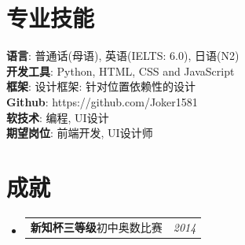 \documentclass[a4paper,UTF8]{ctexart}
\makeatletter
\newcommand{\resumePOR}[3]{
\vspace{0.5mm}\item
    \begin{tabular*}{0.97\textwidth}[t]{l@{\extracolsep{\fill}}r}
        \textbf{#1}\hspace{0.3mm}#2 & \textit{\small{#3}} 
    \end{tabular*}
    \vspace{-2mm}
}
\newcommand{\resumeSubHeadingListStart}{\begin{itemize}[leftmargin=*,labelsep=0mm]}
\newcommand{\resumeSubHeadingListEnd}{\end{itemize}\vspace{2mm}}
\makeatother
\begin{document}
\section{\textbf{专业技能}}
 \begin{itemize}[leftmargin=0.05in, label={}]
    \small{\item{
     \textbf{语言}{: 普通话(母语), 英语(IELTS: 6.0), 日语(N2)} \\
     \textbf{开发工具}{: Python, HTML, CSS and JavaScript} \\
     \textbf{框架}{: 设计框架: 针对位置依赖性的设计} \\
     \textbf{Github}{: https://github.com/Joker1581} \\
     \textbf{软技术}{: 编程, UI设计} \\
     \textbf{期望岗位}{: 前端开发, UI设计师} \\
    }}
 \end{itemize}
 \vspace{-5mm}
 


\section{\textbf{成就}}
\vspace{-0.4mm}
\resumeSubHeadingListStart
\resumePOR{新知杯三等级} %
    {初中奥数比赛} %
    {2014} %
\resumeSubHeadingListEnd
\vspace{-5mm}
\end{document}
